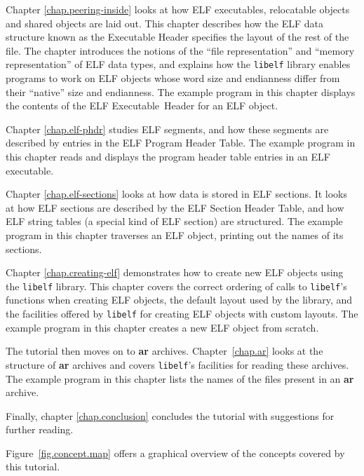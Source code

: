 \documentclass[a4paper,pdftex]{book}
\newcommand{\library}[1]{\texttt{#1}}
\newcommand{\tool}[1]{\textbf{#1}}
\newcommand{\elfdatastructure}[1]{\textsf{#1}}
\begin{document}
Chapter \ref{chap.peering-inside} looks at how ELF executables,
relocatable objects and shared objects are laid out. This chapter
describes how the ELF data structure known as the
\elfdatastructure{Executable Header}
specifies the layout of the rest of the file.  The chapter introduces
the notions of the ``file representation''
and ``memory representation'' of ELF data
types, and explains how the \library{libelf} library enables programs
to work on ELF objects whose word size and endianness differ from
their ``native'' size and endianness. The example program in this
chapter displays the contents of the ELF
\elfdatastructure{Executable~Header} for an
ELF object.

Chapter \ref{chap.elf-phdr} studies ELF segments, and how these
segments are described by entries in the ELF
\elfdatastructure{Prog\-ram Head\-er
  Table}. The example program in this
chapter reads and displays the program header table entries in an ELF
executable.

Chapter \ref{chap.elf-sections} looks at how data is stored in ELF
sections. It looks at how ELF sections are described by the ELF
\elfdatastructure{Section Header Table},
and how ELF string tables (a special kind of ELF section) are
structured. The example program in this chapter traverses an ELF
object, printing out the names of its sections.

Chapter \ref{chap.creating-elf} demonstrates how to create new ELF
objects using the \library{libelf} library. This chapter covers the
correct ordering of calls to \library{libelf}'s functions when
creating ELF objects, the default layout used by the library, and the
facilities offered by \library{libelf} for creating ELF objects with
custom layouts. The example program in this chapter creates a new ELF
object from scratch.

The tutorial then moves on to \tool{ar}
archives. Chapter~\ref{chap.ar} looks at the structure of \tool{ar}
archives and covers \library{libelf}'s facilities for reading these
archives.  The example program in this chapter lists the names of the
files present in an \tool{ar} archive.

Finally, chapter \ref{chap.conclusion} concludes the tutorial with
suggestions for further reading.

Figure~\vref{fig.concept.map} offers a graphical overview of the
concepts covered by this tutorial.
\end{document}
